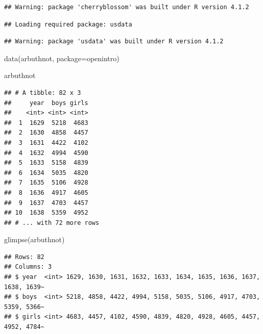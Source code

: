 \documentclass[
]{article}
\newenvironment{Shaded}{\begin{snugshade}}{\end{snugshade}}
\newcommand{\AttributeTok}[1]{\textcolor[rgb]{0.77,0.63,0.00}{#1}}
\newcommand{\FunctionTok}[1]{\textcolor[rgb]{0.00,0.00,0.00}{#1}}
\newcommand{\NormalTok}[1]{#1}
\newcommand{\StringTok}[1]{\textcolor[rgb]{0.31,0.60,0.02}{#1}}
\begin{document}
\begin{verbatim}
## Warning: package 'cherryblossom' was built under R version 4.1.2
\end{verbatim}

\begin{verbatim}
## Loading required package: usdata
\end{verbatim}

\begin{verbatim}
## Warning: package 'usdata' was built under R version 4.1.2
\end{verbatim}

\begin{Shaded}
\begin{Highlighting}[]
\FunctionTok{data}\NormalTok{(}\StringTok{\textquotesingle{}arbuthnot\textquotesingle{}}\NormalTok{, }\AttributeTok{package=}\StringTok{\textquotesingle{}openintro\textquotesingle{}}\NormalTok{)}
\end{Highlighting}
\end{Shaded}

\begin{Shaded}
\begin{Highlighting}[]
\NormalTok{arbuthnot}
\end{Highlighting}
\end{Shaded}

\begin{verbatim}
## # A tibble: 82 x 3
##     year  boys girls
##    <int> <int> <int>
##  1  1629  5218  4683
##  2  1630  4858  4457
##  3  1631  4422  4102
##  4  1632  4994  4590
##  5  1633  5158  4839
##  6  1634  5035  4820
##  7  1635  5106  4928
##  8  1636  4917  4605
##  9  1637  4703  4457
## 10  1638  5359  4952
## # ... with 72 more rows
\end{verbatim}

\begin{Shaded}
\begin{Highlighting}[]
\FunctionTok{glimpse}\NormalTok{(arbuthnot)}
\end{Highlighting}
\end{Shaded}

\begin{verbatim}
## Rows: 82
## Columns: 3
## $ year  <int> 1629, 1630, 1631, 1632, 1633, 1634, 1635, 1636, 1637, 1638, 1639~
## $ boys  <int> 5218, 4858, 4422, 4994, 5158, 5035, 5106, 4917, 4703, 5359, 5366~
## $ girls <int> 4683, 4457, 4102, 4590, 4839, 4820, 4928, 4605, 4457, 4952, 4784~
\end{verbatim}
\end{document}
